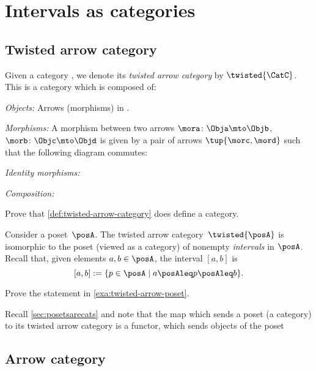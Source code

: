\section{Intervals as categories}

\subsection{Twisted arrow category}



\begin{ctdefinition}\label{def:twisted-arrow-category}
  \label{def:twisted-arrow}
  Given a category \CatC, we denote its \emph{twisted arrow category} by $\twisted{\CatC}$. This is a category which is composed of:
  \begin{compactenum}
    \item \emph{Objects:} Arrows (morphisms) in \CatC.
    \item \emph{Morphisms:} A morphism between two arrows $\mora\colon \Obja \mto \Objb $, $\morb\colon \Objc \mto \Objd$ is given by a pair of arrows $\tup{\morc,\mord}$ such that the following diagram commutes:
    \begin{center}
    \end{center}
    \item \emph{Identity morphisms:}
    \item \emph{Composition:}
  \end{compactenum}
\end{ctdefinition}

\begin{gradedexercise}
Prove that \cref{def:twisted-arrow-category} does define a category.
\end{gradedexercise}


\begin{example}[Intervals]\label{exa:twisted-arrow-poset}
  Consider a poset~$\posA$. The twisted arrow category~$\twisted{\posA}$ is isomorphic to the poset (viewed as a category) of nonempty \emph{intervals} in $\posA$. Recall that, given elements $a, b \in \posA$, the interval $[a,b]$ is
  $$[a,b]:=\{p \in \posA \mid a\posAleq p \posAleq b\}.$$
\end{example}

\begin{exercise}
Prove the statement in \cref{exa:twisted-arrow-poset}.
\end{exercise}
\begin{solution}

\end{solution}
\begin{remark}
  Recall \cref{sec:posetsarecats} and note that the map which sends a poset (a category) to its twisted arrow category is a functor, which sends objects of the poset 
\end{remark}

\subsection{Arrow category}

